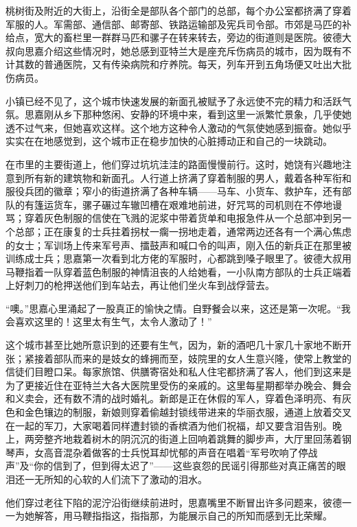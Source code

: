 \par 桃树街及附近的大街上，沿街全是部队各个部门的总部，每个办公室都挤满了穿着军服的人。军需部、通信部、邮寄部、铁路运输部及宪兵司令部。市郊是马匹的补给点，宽大的畜栏里一群群马匹和骡子在转来转去，旁边的街道则是医院。彼德大叔向思嘉介绍这些情况时，她总感到亚特兰大是座充斥伤病员的城市，因为既有不计其数的普通医院，又有传染病院和疗养院。每天，列车开到五角场便又吐出大批伤病员。
\par 小镇已经不见了，这个城市快速发展的新面孔被赋予了永远使不完的精力和活跃气氛。思嘉刚从乡下那种悠闲、安静的环境中来，看到这里一派繁忙景象，几乎使她透不过气来，但她喜欢这样。这个地方这种令人激动的气氛使她感到振奋。她似乎实实在在地感觉到，这个城市正在稳步加快的心脏搏动正和自己的一块跳动。
\par 在市里的主要街道上，他们穿过坑坑洼洼的路面慢慢前行。这时，她饶有兴趣地注意到所有新的建筑物和新面孔。人行道上挤满了穿着制服的男人，戴着各种军衔和服役兵团的徽章；窄小的街道挤满了各种车辆——马车、小货车、救护车，还有部队的有篷运货车，骡子碾过车辙凹槽在艰难地前进，好咒骂的司机则在不停地谩骂；穿着灰色制服的信使在飞溅的泥浆中带着货单和电报急件从一个总部冲到另一个总部；正在康复的士兵拄着拐杖一瘸一拐地走着，通常两边还各有一个满心焦虑的女士；军训场上传来军号声、擂鼓声和喊口令的叫声，刚入伍的新兵正在那里被训练成士兵；思嘉第一次看到北方佬的军服时，心都跳到嗓子眼里了。彼德大叔用马鞭指着一队穿着蓝色制服的神情沮丧的人给她看，一小队南方部队的士兵正端着上好刺刀的枪押送他们到车站去，再让他们坐火车到战俘营去。
\par “噢。”思嘉心里涌起了一股真正的愉快之情。自野餐会以来，这还是第一次呢。“我会喜欢这里的！这里太有生气，太令人激动了！”
\par 这个城市甚至比她所意识到的还要有生气，因为，新的酒吧几十家几十家地不断开张；紧接着部队而来的是妓女的蜂拥而至，妓院里的女人生意兴隆，使常上教堂的信徒们目瞪口呆。每家旅馆、供膳寄宿处和私人住宅都挤满了客人，他们到这来是为了更接近住在亚特兰大各大医院里受伤的亲戚的。这里每星期都举办晚会、舞会和义卖会，还有数不清的战时婚礼。新郎是正在休假的军人，穿着色泽明亮、有灰色和金色镶边的制服，新娘则穿着偷越封锁线带进来的华丽衣服，通道上放着交叉在一起的军刀，大家喝着同样遭封锁的香槟酒为他们祝福，却又要含泪告别。晚上，两旁整齐地栽着树木的阴沉沉的街道上回响着跳舞的脚步声，大厅里回荡着钢琴声，女高音混杂着做客的士兵悦耳却忧郁的声音在唱着“军号吹响了停战声”及“你的信到了，但到得太迟了”——这些哀怨的民谣引得那些对真正痛苦的眼泪还一无所知的心软的人们流下了激动的泪水。
\par 他们穿过老往下陷的泥泞沿街继续前进时，思嘉嘴里不断冒出许多问题来，彼德一一为她解答，用马鞭指指这，指指那，为能展示自己的所知而感到无比荣耀。
